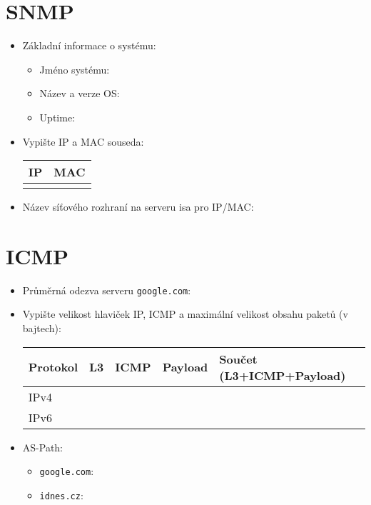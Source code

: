 \section{SNMP}
\begin{itemize}
    \item Základní informace o systému:
    \begin{itemize}
        \item Jméno systému:
         \vspace{1cm}
        \item Název a verze OS:
         \vspace{1cm}
        \item Uptime:
         \vspace{1cm}
    \end{itemize}
    \item Vypište IP a MAC souseda:
    
\begin{tabular}{|p{4cm}|p{4cm}|}
\hline
IP  & MAC   \\ \hline
      &     \\   \hline
\end{tabular}
    \item Název síťového rozhraní na serveru isa pro IP/MAC:
     \vspace{1cm}
\end{itemize}

\section{ICMP}
\begin{itemize}
    \item Průměrná odezva serveru \texttt{google.com}:
    \item Vypište velikost hlaviček IP, ICMP a maximální velikost obsahu paketů (v bajtech):
    
    \begin{tabular}{|p{2cm}|p{2cm}|p{2cm}|l|l|}  \hline
     Protokol  & L3  & ICMP  & Payload & Součet (L3+ICMP+Payload) \\ \hline
     IPv4      &     &       &         &   \\   \hline
     IPv6      &     &       &         &     \\  \hline
\end{tabular}
    
    \item AS-Path:
        \begin{itemize}
            \item \texttt{google.com}:
            \vspace{3cm}
            \item \texttt{idnes.cz}:
            \vspace{3cm}
        \end{itemize}
\end{itemize}
